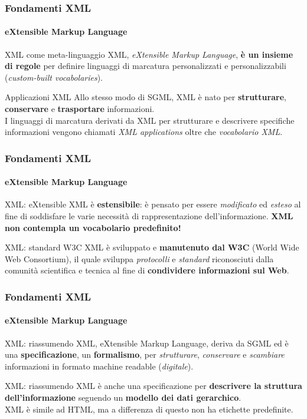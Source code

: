 \begin{frame}
	\frametitle{Fondamenti XML}
	\framesubtitle{eXtensible Markup Language}
	\addtocounter{nframe}{1}

	\begin{block}{XML come meta-linguaggio}
		XML, \textit{eXtensible Markup Language}, \textbf{è un insieme di regole} per definire linguaggi di marcatura personalizzati e personalizzabili (\textit{custom-built vocabolaries}).
	\end{block}

	\begin{block} {Applicazioni XML}
		Allo stesso modo di SGML, XML è nato per \textbf{strutturare}, \textbf{conservare} e \textbf{trasportare} informazioni.
		\\ I linguaggi di marcatura derivati da XML per strutturare e descrivere specifiche informazioni vengono chiamati \textit{XML applications} oltre che \textit{vocabolario XML}.
	\end{block}
\end{frame}

\begin{frame}
	\frametitle{Fondamenti XML}
	\framesubtitle{eXtensible Markup Language}
	\addtocounter{nframe}{1}

	\begin{block}{XML: eXtensible}
		XML è \textbf{estensibile}: è pensato per essere \textit{modificato} ed \textit{esteso} al fine di soddisfare le varie necessità di rappresentazione dell'informazione.
		\textbf{XML non contempla un vocabolario predefinito!}
	\end{block}

	\begin{block} {XML: standard W3C}
		XML è sviluppato e \textbf{manutenuto dal W3C} (World Wide Web Consortium), il quale sviluppa \textit{protocolli} e \textit{standard} riconosciuti dalla comunità scientifica e tecnica al fine di \textbf{condividere informazioni sul Web}.
	\end{block}
\end{frame}

\begin{frame}
	\frametitle{Fondamenti XML}
	\framesubtitle{eXtensible Markup Language}
	\addtocounter{nframe}{1}

	\begin{block}{XML: riassumendo}
		XML, eXtensible Markup Language, deriva da SGML ed 
		è una \textbf{specificazione}, un \textbf{formalismo}, per \textit{strutturare}, \textit{conservare} e \textit{scambiare} informazioni in formato machine readable (\textit{digitale}).
	\end{block}

	\begin{block}{XML: riassumendo}
		XML è anche una specificazione per \textbf{descrivere la struttura dell'informazione} seguendo un \textbf{modello dei dati gerarchico}.
		\\ XML è simile ad HTML, ma a differenza di questo non ha etichette predefinite.
	\end{block}

\end{frame}



